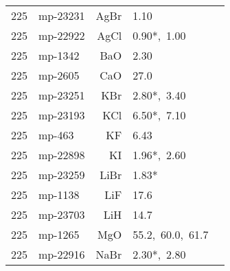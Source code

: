 \begin{table*}[ht]
\begin{center}
\begin{tabular}{rlrll}
     225 &    mp-23231 &          AgBr &            1.10 &      \cite{Kamran.2007} \\
     225 &    mp-22922 &          AgCl &            0.90*,~1.00 &        \cite{Ross.1981,Maqsood.2004} \\
     225 &     mp-1342 &           BaO &            2.30 &     \cite{Morelli.2006} \\
     225 &     mp-2605 &           CaO &            27.0 &     \cite{Morelli.2006} \\
     225 &    mp-23251 &           KBr &            2.80*,~3.40 &   \cite{Andersson.1985,Morelli.2006} \\
     225 &    mp-23193 &           KCl &            6.50*,~7.10 &   \cite{Andersson.1985,Morelli.2006} \\
     225 &      mp-463 &            KF &            6.43 &     \cite{Morelli.2006} \\
     225 &    mp-22898 &            KI &            1.96*,~2.60 &   \cite{Andersson.1985,Morelli.2006} \\
     225 &    mp-23259 &          LiBr &            1.83* &   \cite{Hakansson.1989} \\
     225 &     mp-1138 &           LiF &            17.6 &     \cite{Morelli.2006} \\
     225 &    mp-23703 &           LiH &            14.7 &     \cite{Slack.1973} \\
     225 &     mp-1265 &           MgO &            55.2,~60.0,~61.7 &   \cite{Andersson.1986,Morelli.2006,Macpherson.1983} \\
     225 &    mp-22916 &          NaBr &            2.30*,~2.80 &     \cite{Sigalas.1985,Morelli.2006} \\

\end{tabular}
\end{center}
\end{table*}
